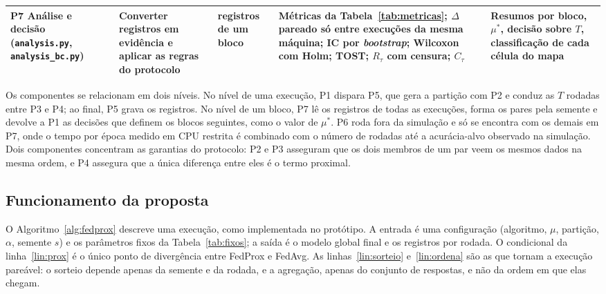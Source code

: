 \begin{table}[t]
\begin{tabular}{@{}L{2.6cm}L{3.3cm}L{2.9cm}L{4.6cm}L{3.4cm}@{}}
        P7 Análise e decisão (\texttt{analysis.py}, \texttt{analysis\_bc.py}) & Converter registros em evidência e aplicar as regras do protocolo & registros de um bloco & Métricas da Tabela~\ref{tab:metricas}; $\Delta$ pareado só entre execuções da mesma máquina; IC por \textit{bootstrap}; Wilcoxon com Holm; TOST; $R_\tau$ com censura; $C_\tau$ & Resumos por bloco, $\mu^*$, decisão sobre $T$, classificação de cada célula do mapa \\
        \bottomrule
    \end{tabular}
\end{table}

Os componentes se relacionam em dois níveis. No nível de uma execução, P1 dispara P5, que gera a partição com P2 e conduz as $T$ rodadas entre P3 e P4; ao final, P5 grava os registros. No nível de um bloco, P7 lê os registros de todas as execuções, forma os pares pela semente e devolve a P1 as decisões que definem os blocos seguintes, como o valor de $\mu^*$. P6 roda fora da simulação e só se encontra com os demais em P7, onde o tempo por época medido em CPU restrita é combinado com o número de rodadas até a acurácia-alvo observado na simulação. Dois componentes concentram as garantias do protocolo: P2 e P3 asseguram que os dois membros de um par veem os mesmos dados na mesma ordem, e P4 assegura que a única diferença entre eles é o termo proximal.

\subsection{Funcionamento da proposta}
\label{sec:funcionamento}

O Algoritmo~\ref{alg:fedprox} descreve uma execução, como implementada no protótipo. A entrada é uma configuração (algoritmo, $\mu$, partição, $\alpha$, semente $s$) e os parâmetros fixos da Tabela~\ref{tab:fixos}; a saída é o modelo global final e os registros por rodada. O condicional da linha~\ref{lin:prox} é o único ponto de divergência entre FedProx e FedAvg. As linhas~\ref{lin:sorteio} e~\ref{lin:ordena} são as que tornam a execução pareável: o sorteio depende apenas da semente e da rodada, e a agregação, apenas do conjunto de respostas, e não da ordem em que elas chegam.

